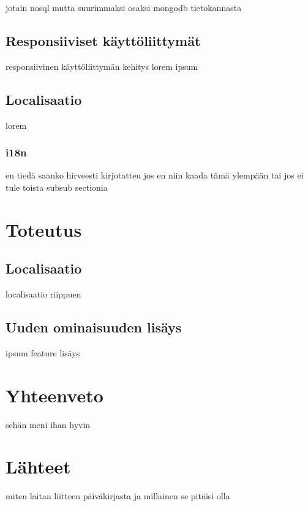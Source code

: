 \documentclass[11pt,a4paper,titlepage,oneside]{article}
\begin{document}
jotain nosql mutta suurimmaksi osaksi mongodb tietokannasta






\subsection{Responsiiviset käyttöliittymät}
responsiivinen käyttöliittymän kehitys lorem ipsum






\subsection{Localisaatio}
lorem

\subsubsection{i18n}
en tiedä saanko hirveesti kirjotatteu
jos en niin kaada tämä ylempään
tai jos ei tule toista subsub sectionia










\newpage
\section{Toteutus}              %


\subsection{Localisaatio}
localisaatio riippuen 


\subsection{Uuden ominaisuuden lisäys}
ipsum feature lisäys



\section{Yhteenveto}


sehän meni ihan hyvin 




\newpage
\section{Lähteet}               %

miten laitan liitteen päiväkirjasta ja millainen se pitäisi olla
\end{document}
